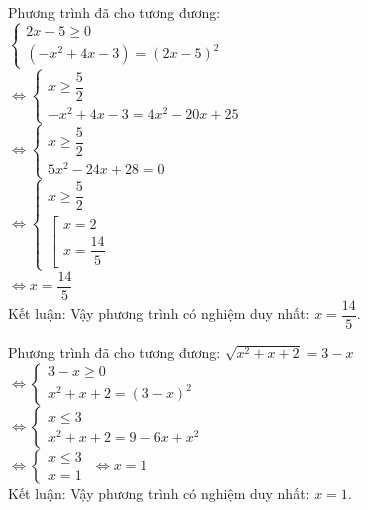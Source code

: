 \begin{Answer}{1}
    Phương trình đã cho tương đương: \\
    $ \begin{cases}
        2x -5 \geq 0 \\
        (-x^2 +4x -3) = (2x-5)^2
    \end{cases} $ \\
    $ \Leftrightarrow
        \begin{cases}
            x \geq \dfrac{5}{2} \\
            -x^2 + 4x -3 = 4x^2 -20x + 25
        \end{cases} $ \\
    $ \Leftrightarrow
    \begin{cases}
        x \geq \dfrac{5}{2 } \\
        5x^2 -24x +28 =0
    \end{cases} $ \\
    $ \Leftrightarrow
    \begin{cases}
        x \geq \dfrac{5 }{2 } \\
        \left[
            \begin{array}{l}
                x=2 \\
                x=\dfrac{14 }{5 }
            \end{array}
        \right.
    \end{cases} $ \\
    $ \Leftrightarrow  x=\dfrac{14 }{5 } $ \\
    Kết luận: Vậy phương trình có nghiệm duy nhất: $ x=\dfrac{14 }{5 }   $.
\end{Answer}
\begin{Answer}{2}
Phương trình đã cho tương đương: $ \sqrt{x^2 + x +2 } = 3 - x $ \\
$ \Leftrightarrow
\begin{cases}
    3-x \geq 0 \\
    x^2 + x + 2 = (3-x )^2
\end{cases} $ \\
$ \Leftrightarrow
\begin{cases}
    x \leq 3 \\
    x^2 + x + 2 = 9 -6x + x^2
\end{cases} $ \\
$ \Leftrightarrow
\begin{cases}
    x \leq 3 \\
    x=1
\end{cases} $
$ \Leftrightarrow x=1 $ \\
Kết luận: Vậy phương trình có nghiệm duy nhất: $ x=1 $.
\end{Answer}

